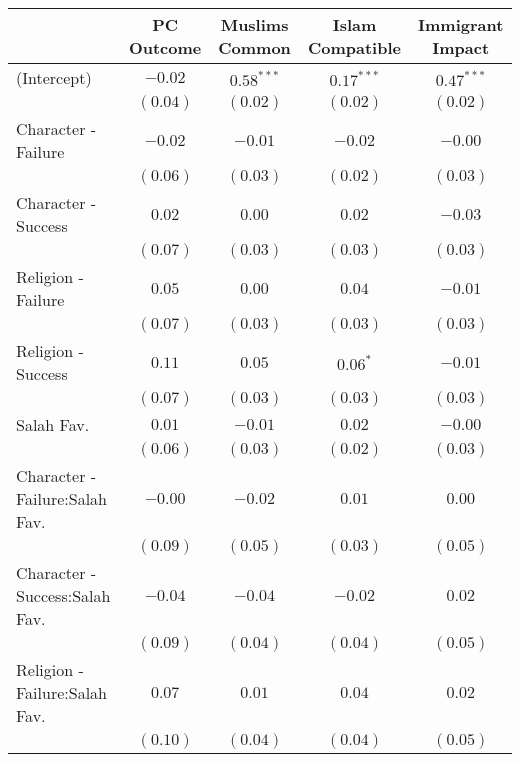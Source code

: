 
\begin{table}[H]
\begin{center}
\begin{footnotesize}
\begin{tabular}{l c c c c}
\hline
 & PC Outcome & Muslims Common & Islam Compatible & Immigrant Impact \\
\hline
(Intercept)                    & $-0.02$  & $0.58^{***}$ & $0.17^{***}$ & $0.47^{***}$ \\
                               & $(0.04)$ & $(0.02)$     & $(0.02)$     & $(0.02)$     \\
Character - Failure            & $-0.02$  & $-0.01$      & $-0.02$      & $-0.00$      \\
                               & $(0.06)$ & $(0.03)$     & $(0.02)$     & $(0.03)$     \\
Character - Success            & $0.02$   & $0.00$       & $0.02$       & $-0.03$      \\
                               & $(0.07)$ & $(0.03)$     & $(0.03)$     & $(0.03)$     \\
Religion - Failure             & $0.05$   & $0.00$       & $0.04$       & $-0.01$      \\
                               & $(0.07)$ & $(0.03)$     & $(0.03)$     & $(0.03)$     \\
Religion - Success             & $0.11$   & $0.05$       & $0.06^{*}$   & $-0.01$      \\
                               & $(0.07)$ & $(0.03)$     & $(0.03)$     & $(0.03)$     \\
Salah Fav.                     & $0.01$   & $-0.01$      & $0.02$       & $-0.00$      \\
                               & $(0.06)$ & $(0.03)$     & $(0.02)$     & $(0.03)$     \\
Character - Failure:Salah Fav. & $-0.00$  & $-0.02$      & $0.01$       & $0.00$       \\
                               & $(0.09)$ & $(0.05)$     & $(0.03)$     & $(0.05)$     \\
Character - Success:Salah Fav. & $-0.04$  & $-0.04$      & $-0.02$      & $0.02$       \\
                               & $(0.09)$ & $(0.04)$     & $(0.04)$     & $(0.05)$     \\
Religion - Failure:Salah Fav.  & $0.07$   & $0.01$       & $0.04$       & $0.02$       \\
                               & $(0.10)$ & $(0.04)$     & $(0.04)$     & $(0.05)$     \\

\end{tabular}
\end{footnotesize}
\end{center}
\end{table}
